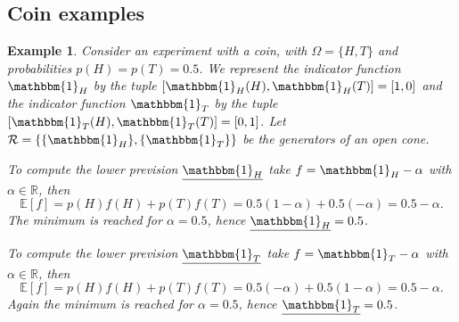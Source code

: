 \documentclass{article}
\theoremstyle{mytheorem}
\newtheorem{example}[theorem]{Example}
\newcommand{\set}[1]{\ensuremath{\{ #1 \} }} %
\newcommand{\indicator}[1]{\ensuremath{\mathbbm{1}_{#1}}} %
\newcommand{\expectation}[1]{\ensuremath{\mathbb{E}[{#1}]}} %
\begin{document}
\subsection{Coin examples}
\begin{example}
Consider an experiment with a coin, with $\Omega = \set{H, T}$ and probabilities $p(H) = p(T) = 0.5$. 
We represent the indicator function $\indicator{H}$ by the tuple $[\indicator{H}(H), \indicator{H}(T)] = [1, 0]$ and the indicator function $\indicator{T}$ by the tuple $[\indicator{T}(H), \indicator{T}(T)] = [0, 1]$.
Let $\mathcal{R} = \set{ \set{\indicator{H}}, \set{\indicator{T}}}$ be the generators of an open cone.

\vspace{0.5cm}
\noindent
To compute the lower prevision $\underline{\indicator{H}}$ take $f = \indicator{H} - \alpha$ with $\alpha \in \mathbb{R}$, then
\[
    \expectation{f} =
      p(H) f(H) + p(T) f(T) = 
      0.5 (1 - \alpha) + 0.5 (- \alpha) = 
      0.5 - \alpha.
\]
The minimum is reached for $\alpha = 0.5$, hence $\underline{\indicator{H}} = 0.5$. 

\vspace{0.5cm}
\noindent
To compute the lower prevision $\underline{\indicator{T}}$ take $f = \indicator{T} - \alpha$ with $\alpha \in \mathbb{R}$, then
\[
    \expectation{f} =
      p(H) f(H) + p(T) f(T) = 
      0.5 (- \alpha) + 0.5 (1 - \alpha) = 
      0.5 - \alpha.
\]
Again the minimum is reached for $\alpha = 0.5$, hence $\underline{\indicator{T}} = 0.5$. 
\end{example}
\end{document}

